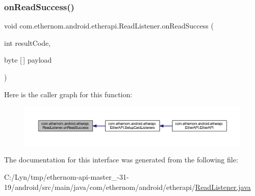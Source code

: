 \mbox{\label{interfacecom_1_1ethernom_1_1android_1_1etherapi_1_1_read_listener_a404114d62b92d1b844bdbb189711f7e9}} 
\subsubsection{\texorpdfstring{on\+Read\+Success()}{onReadSuccess()}}
{\footnotesize\ttfamily void com.\+ethernom.\+android.\+etherapi.\+Read\+Listener.\+on\+Read\+Success (\begin{DoxyParamCaption}\item[{int}]{result\+Code,  }\item[{byte \mbox{[}$\,$\mbox{]}}]{payload }\end{DoxyParamCaption})}

Here is the caller graph for this function\+:\nopagebreak
\begin{figure}[H]
\begin{center}
\leavevmode
\includegraphics[width=350pt]{interfacecom_1_1ethernom_1_1android_1_1etherapi_1_1_read_listener_a404114d62b92d1b844bdbb189711f7e9_icgraph}
\end{center}
\end{figure}


The documentation for this interface was generated from the following file\+:\begin{DoxyCompactItemize}
\item 
C\+:/\+Lyn/tmp/ethernom-\/api-\/master\+\_-\/31-\/19/android/src/main/java/com/ethernom/android/etherapi/\mbox{\hyperlink{_read_listener_8java}{Read\+Listener.\+java}}\end{DoxyCompactItemize}
